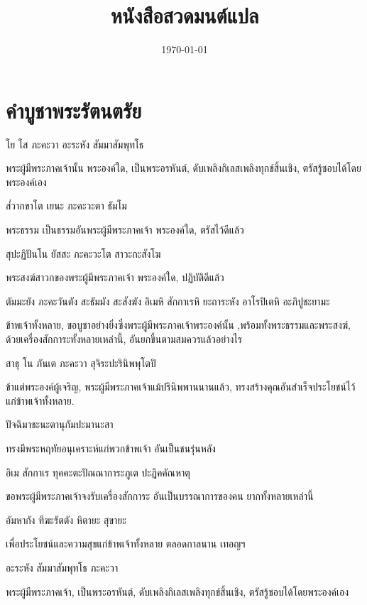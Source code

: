 \documentclass{article}
\title{หนังสือสวดมนต์แปล}
\date{\today}
\begin{document}
\pagecolor{lightyellow}
\maketitle
\newpage
\tableofcontents

\newpage
\section{คำบูชาพระรัตนตรัย}
โย โส ภะคะวา อะระหัง สัมมาสัมพุทโธ
\begin{description}
พระผู้มีพระภาคเจ้านั้น พระองค์ใด, เป็นพระอรหันต์, 
ดับเพลิงกิเลสเพลิงทุกข์สิ้นเชิง, ตรัสรู้ชอบได้โดยพระองค์เอง
\end{description}
ส๎วากขาโต เยนะ ภะคะวะตา ธัมโม 
\begin{description}
พระธรรม เป็นธรรมอันพระผู้มีพระภาคเจ้า พระองค์ใด, ตรัสไว้ดีแล้ว
\end{description}
สุปะฏิปันโน ยัสสะ ภะคะวะโต สาวะกะสังโฆ
\begin{description}
พระสงฆ์สาวกของพระผู้มีพระภาคเจ้า พระองค์ใด, ปฏิบัติดีแล้ว
\end{description}
ตัมมะยัง ภะคะวันตัง สะธัมมัง สะสังฆัง
อิเมหิ สักกาเรหิ ยะถาระหัง อาโรปิเตหิ อะภิปูชะยามะ
\begin{description}
ข้าพเจ้าทั้งหลาย, ขอบูชาอย่างยิ่งซึ่งพระผู้มีพระภาคเจ้าพระองค์นั้น
,พร้อมทั้งพระธรรมและพระสงฆ์,
ด้วยเครื่องสักการะทั้งหลายเหล่านี้, อันยกขึ้นตามสมควรแล้วอย่างไร
\end{description}
สาธุ โน ภันเต ภะคะวา สุจิระปะรินิพพุโตปิ
\begin{description}
ข้าแต่พระองค์ผู้เจริญ, พระผู้มีพระภาคเจ้าแม้ปรินิพพานนานแล้ว,
ทรงสร้างคุณอันสำเร็จประโยชน์ไว้แก่ข้าพเจ้าทั้งหลาย.
\end{description}
ปัจฉิมาชะนะตานุกัมปะมานะสา
\begin{description}
ทรงมีพระหฤทัยอนุเคราะห์แก่พวกข้าพเจ้า อันเป็นชนรุ่นหลัง
\end{description}
อิเม สักกาเร ทุคคะตะปัณณาการะภูเต ปะฏิคคัณหาตุ
\begin{description}
ขอพระผู้มีพระภาคเจ้าจงรับเครื่องสักการะ อันเป็นบรรณาการของคน
ยากทั้งหลายเหล่านี้
\end{description}
อัมหากัง ทีฆะรัตตัง หิตายะ สุขายะ
\begin{description}
เพื่อประโยชน์และความสุขแก่ข้าพเจ้าทั้งหลาย ตลอดกาลนาน เทอญฯ
\end{description}
อะระหัง สัมมาสัมพุทโธ ภะคะวา
\begin{description}
พระผู้มีพระภาคเจ้า, เป็นพระอรหันต์, ดับเพลิงกิเลสเพลิงทุกข์สิ้นเชิง,
ตรัสรู้ชอบได้โดยพระองค์เอง
\end{description}
\end{document}
